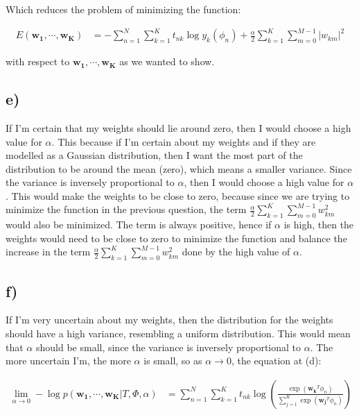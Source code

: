 \documentclass[12pt,a4paper,oneside]{paper}
\begin{document}
Which reduces the problem of minimizing the function: 

\begin{align*}
    E(\bm{w_1}, \cdots, \bm{w_K}) &= -\sum_{n=1}^{N} \sum_{k=1}^{K} t_{nk} \log y_k(\phi_n) + \frac{\alpha}{2} \sum_{k=1}^{K} \sum_{m=0}^{M - 1} |w_{km}|^2
\end{align*}

with respect to $\bm{w_1}, \cdots, \bm{w_K}$ as we wanted to show.

\newpage
\subsection*{e)}

If I'm certain that my weights should lie around zero, then I would choose a high value for $\alpha$. This because
if I'm certain about my weights and if they are modelled as a Gaussian distribution, then I want the most part of the
distribution to be around the mean (zero), which means a smaller variance. Since the variance is inversely proportional to $\alpha$,
then I would choose a high value for $\alpha$. This would make the weights to be close to zero, because
since we are trying to minimize the function in the previous question, the term $\frac{\alpha}{2} \sum_{k=1}^{K} \sum_{m=0}^{M - 1} w_{km}^2$
would also be minimized. The term is always positive, hence if $\alpha$ is high, then the weights would need to be close to zero to minimize the function
and balance the increase in the term $\frac{\alpha}{2} \sum_{k=1}^{K} \sum_{m=0}^{M - 1} w_{km}^2$ done by the high value of $\alpha$.

\newpage
\subsection*{f)}

If I'm very uncertain about my weights, then the distribution for the weights should have a high variance, 
resembling a uniform distribution. This would mean that $\alpha$ should be small, since the variance is inversely proportional to $\alpha$.
The more uncertain I'm, the more $\alpha$ is small, so as $\alpha \rightarrow 0$, the equation at (d):

\begin{align*}
    \lim_{\alpha \rightarrow 0} -\log p(\bm{w_1}, \cdots, \bm{w_K} | T, \Phi, \alpha) &= \sum_{n=1}^{N} \sum_{k=1}^{K} t_{nk} \log \left(\frac{\exp(\bm{w_k}^T \phi_n)}{\sum_{j=1}^{K} \exp(\bm{w_j}^T \phi_n)}\right)
\end{align*}
\end{document}
